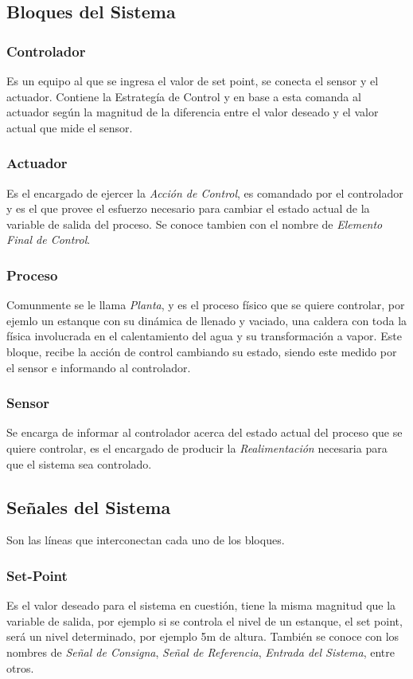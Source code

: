 \documentclass[letterpaper,journal]{ieeetran}
\begin{document}
\begin{itemize}
	\subsection{Bloques del Sistema}
	
	\subsubsection{Controlador}
	Es un equipo al que se ingresa el valor de set point, se conecta el sensor y el actuador. Contiene la Estrategía de Control y en base a esta comanda al actuador según la magnitud de la diferencia entre el valor deseado y el valor actual que mide el sensor.
	
	\subsubsection{Actuador}
	Es el encargado de ejercer la  \emph{Acción de Control}, es comandado por el controlador y es el que provee el esfuerzo necesario para cambiar el estado actual de la variable de salida del proceso. Se conoce tambien con el nombre de \emph{Elemento Final de Control}.
	
	\subsubsection{Proceso}
	Comunmente se le llama \emph{Planta}, y es el proceso físico que se quiere controlar, por ejemlo un estanque con su dinámica de llenado y vaciado, una caldera con toda la física involucrada en el calentamiento del agua y su transformación a vapor. Este bloque, recibe la acción de control cambiando su estado, siendo este medido por el sensor e informando al controlador.
	
	\subsubsection{Sensor}
	Se encarga de informar al controlador acerca del estado actual del proceso que se quiere controlar, es el encargado de producir la \emph{Realimentación} necesaria para que el sistema sea controlado.
	
	\subsection{Señales del Sistema}
	
	Son las líneas que interconectan cada uno de los bloques.
	
	\subsubsection{Set-Point} Es el valor deseado para el sistema en cuestión, tiene la misma magnitud que la variable de salida, por ejemplo si se controla el nivel de un estanque, el set point, será un nivel determinado, por ejemplo 5m de altura. También se conoce con los nombres de \emph{Señal de Consigna}, \emph{Señal de Referencia}, \emph{Entrada del Sistema}, entre otros.
	

\end{itemize}
\end{document}

